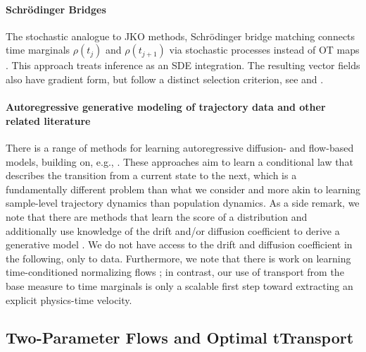 \documentclass{article}
\theoremstyle{definition}
\theoremstyle{plain}
\theoremstyle{definition}
\theoremstyle{remark}
\begin{document}
\vspace*{-0.35cm}\paragraph{Schr\"odinger Bridges} The stochastic analogue to JKO methods, Schr\"odinger bridge matching connects time marginals $\rho(t_j)$ and $\rho(t_{j+1})$ via stochastic processes instead of OT maps \cite{chen_multi-marginal_2019, chen_deep_2023, shen_multi-marginal_2025, hong2025trajectory}. This approach treats inference as an SDE integration. The resulting vector fields also have gradient form, but follow a distinct selection criterion, see \citep[Definition 2.1]{leonard_survey_2014} and \citep[Chapter~7]{villani_optimal_2009}.

\vspace*{-0.35cm}\paragraph{Autoregressive generative modeling of trajectory data and other related literature} There is a range of methods \cite{hoogeboom2021autoregressive,ruhling2023dyffusion,chen2024probabilistic,Price2025} for learning autoregressive diffusion- and flow-based models, building on, e.g., \cite{sohl-dickstein15,HOjon_ddpm,hyvarinen05a,song2019sliced,song2020generativealg,song2021scorebased,albergo2023stochastic,lipman2022flow, liu_flow_2023}. These approaches aim to learn a conditional law that describes the transition from a current state to the next, which is a fundamentally different problem than what we consider and more akin to learning sample-level trajectory dynamics than population dynamics. As a side remark, we note that there are methods that learn the score of a distribution and additionally use knowledge of the drift and/or diffusion coefficient to derive a generative model \cite{NEURIPS2023_b2b781ba}. We do not have access to the drift and diffusion coefficient in the following, only to data. Furthermore, we note that there is work on learning time-conditioned normalizing flows  \cite{ICLR2024_7718914d}; in contrast, our use of transport from the base measure to time marginals is only a scalable first step toward extracting an explicit physics-time velocity. 



\subsection{Two-Parameter Flows and Optimal tTransport}\label{sec:Intro:TPFNotOT}
\end{document}
